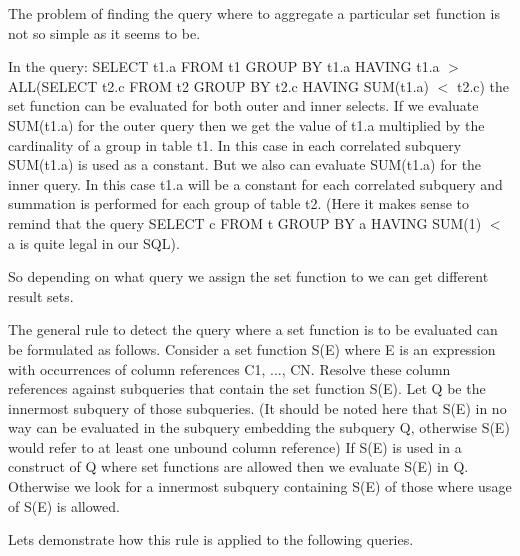 The problem of finding the query where to aggregate a particular set function is not so simple as it seems to be.

In the query\+: S\+E\+L\+E\+CT t1.\+a F\+R\+OM t1 G\+R\+O\+UP BY t1.\+a H\+A\+V\+I\+NG t1.\+a $>$ A\+LL(S\+E\+L\+E\+CT t2.\+c F\+R\+OM t2 G\+R\+O\+UP BY t2.\+c H\+A\+V\+I\+NG S\+UM(t1.\+a) $<$ t2.\+c) the set function can be evaluated for both outer and inner selects. If we evaluate S\+UM(t1.\+a) for the outer query then we get the value of t1.\+a multiplied by the cardinality of a group in table t1. In this case in each correlated subquery S\+UM(t1.\+a) is used as a constant. But we also can evaluate S\+UM(t1.\+a) for the inner query. In this case t1.\+a will be a constant for each correlated subquery and summation is performed for each group of table t2. (Here it makes sense to remind that the query S\+E\+L\+E\+CT c F\+R\+OM t G\+R\+O\+UP BY a H\+A\+V\+I\+NG S\+U\+M(1) $<$ a is quite legal in our S\+QL).

So depending on what query we assign the set function to we can get different result sets.

The general rule to detect the query where a set function is to be evaluated can be formulated as follows. Consider a set function S(\+E) where E is an expression with occurrences of column references C1, ..., CN. Resolve these column references against subqueries that contain the set function S(\+E). Let Q be the innermost subquery of those subqueries. (It should be noted here that S(\+E) in no way can be evaluated in the subquery embedding the subquery Q, otherwise S(\+E) would refer to at least one unbound column reference) If S(\+E) is used in a construct of Q where set functions are allowed then we evaluate S(\+E) in Q. Otherwise we look for a innermost subquery containing S(\+E) of those where usage of S(\+E) is allowed.

Let\textquotesingle{}s demonstrate how this rule is applied to the following queries.


